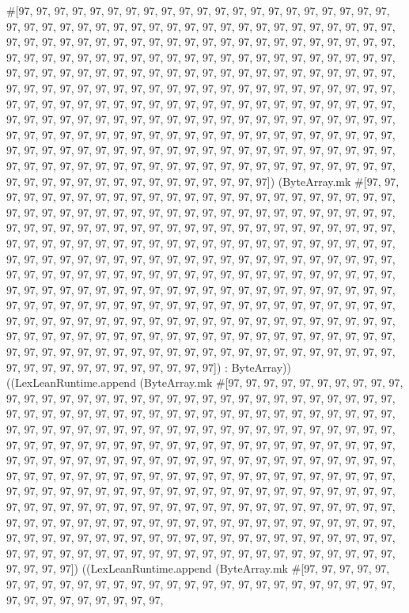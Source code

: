\documentclass[11pt]{article}
\begin{document}
\#[97, 97, 97, 97, 97, 97, 97, 97, 97, 97, 97, 97, 97, 97, 97, 97, 97, 97, 97, 97, 97, 97, 97, 97, 97, 97, 97, 97, 97, 97, 97, 97, 97, 97, 97, 97, 97, 97, 97, 97, 97, 97, 97, 97, 97, 97, 97, 97, 97, 97, 97, 97, 97, 97, 97, 97, 97, 97, 97, 97, 97, 97, 97, 97, 97, 97, 97, 97, 97, 97, 97, 97, 97, 97, 97, 97, 97, 97, 97, 97, 97, 97, 97, 97, 97, 97, 97, 97, 97, 97, 97, 97, 97, 97, 97, 97, 97, 97, 97, 97, 97, 97, 97, 97, 97, 97, 97, 97, 97, 97, 97, 97, 97, 97, 97, 97, 97, 97, 97, 97, 97, 97, 97, 97, 97, 97, 97, 97, 97, 97, 97, 97, 97, 97, 97, 97, 97, 97, 97, 97, 97, 97, 97, 97, 97, 97, 97, 97, 97, 97, 97, 97, 97, 97, 97, 97, 97, 97, 97, 97, 97, 97, 97, 97, 97, 97, 97, 97, 97, 97, 97, 97, 97, 97, 97, 97, 97, 97, 97, 97, 97, 97, 97, 97, 97, 97, 97, 97, 97, 97, 97, 97, 97, 97, 97, 97, 97, 97, 97, 97, 97, 97, 97, 97, 97, 97, 97, 97, 97, 97, 97, 97, 97, 97, 97, 97, 97, 97, 97, 97, 97, 97, 97, 97, 97, 97, 97, 97, 97, 97, 97, 97, 97, 97, 97, 97, 97, 97, 97, 97, 97, 97, 97, 97, 97, 97, 97, 97, 97, 97, 97, 97, 97, 97, 97, 97]) (ByteArray.mk \#[97, 97, 97, 97, 97, 97, 97, 97, 97, 97, 97, 97, 97, 97, 97, 97, 97, 97, 97, 97, 97, 97, 97, 97, 97, 97, 97, 97, 97, 97, 97, 97, 97, 97, 97, 97, 97, 97, 97, 97, 97, 97, 97, 97, 97, 97, 97, 97, 97, 97, 97, 97, 97, 97, 97, 97, 97, 97, 97, 97, 97, 97, 97, 97, 97, 97, 97, 97, 97, 97, 97, 97, 97, 97, 97, 97, 97, 97, 97, 97, 97, 97, 97, 97, 97, 97, 97, 97, 97, 97, 97, 97, 97, 97, 97, 97, 97, 97, 97, 97, 97, 97, 97, 97, 97, 97, 97, 97, 97, 97, 97, 97, 97, 97, 97, 97, 97, 97, 97, 97, 97, 97, 97, 97, 97, 97, 97, 97, 97, 97, 97, 97, 97, 97, 97, 97, 97, 97, 97, 97, 97, 97, 97, 97, 97, 97, 97, 97, 97, 97, 97, 97, 97, 97, 97, 97, 97, 97, 97, 97, 97, 97, 97, 97, 97, 97, 97, 97, 97, 97, 97, 97, 97, 97, 97, 97, 97, 97, 97, 97, 97, 97, 97, 97, 97, 97, 97, 97, 97, 97, 97, 97, 97, 97, 97, 97, 97, 97, 97, 97, 97, 97, 97, 97, 97, 97, 97, 97, 97, 97, 97, 97, 97, 97, 97, 97, 97, 97, 97, 97, 97, 97, 97, 97, 97, 97, 97, 97, 97, 97, 97, 97, 97, 97, 97, 97, 97, 97, 97, 97, 97, 97, 97, 97, 97, 97, 97, 97, 97, 97, 97, 97, 97, 97, 97, 97]) : ByteArray)) ((LexLeanRuntime.append (ByteArray.mk \#[97, 97, 97, 97, 97, 97, 97, 97, 97, 97, 97, 97, 97, 97, 97, 97, 97, 97, 97, 97, 97, 97, 97, 97, 97, 97, 97, 97, 97, 97, 97, 97, 97, 97, 97, 97, 97, 97, 97, 97, 97, 97, 97, 97, 97, 97, 97, 97, 97, 97, 97, 97, 97, 97, 97, 97, 97, 97, 97, 97, 97, 97, 97, 97, 97, 97, 97, 97, 97, 97, 97, 97, 97, 97, 97, 97, 97, 97, 97, 97, 97, 97, 97, 97, 97, 97, 97, 97, 97, 97, 97, 97, 97, 97, 97, 97, 97, 97, 97, 97, 97, 97, 97, 97, 97, 97, 97, 97, 97, 97, 97, 97, 97, 97, 97, 97, 97, 97, 97, 97, 97, 97, 97, 97, 97, 97, 97, 97, 97, 97, 97, 97, 97, 97, 97, 97, 97, 97, 97, 97, 97, 97, 97, 97, 97, 97, 97, 97, 97, 97, 97, 97, 97, 97, 97, 97, 97, 97, 97, 97, 97, 97, 97, 97, 97, 97, 97, 97, 97, 97, 97, 97, 97, 97, 97, 97, 97, 97, 97, 97, 97, 97, 97, 97, 97, 97, 97, 97, 97, 97, 97, 97, 97, 97, 97, 97, 97, 97, 97, 97, 97, 97, 97, 97, 97, 97, 97, 97, 97, 97, 97, 97, 97, 97, 97, 97, 97, 97, 97, 97, 97, 97, 97, 97, 97, 97, 97, 97, 97, 97, 97, 97, 97, 97, 97, 97, 97, 97, 97, 97, 97, 97, 97, 97, 97, 97, 97, 97, 97, 97, 97, 97, 97, 97, 97, 97]) ((LexLeanRuntime.append (ByteArray.mk \#[97, 97, 97, 97, 97, 97, 97, 97, 97, 97, 97, 97, 97, 97, 97, 97, 97, 97, 97, 97, 97, 97, 97, 97, 97, 97, 97, 97, 97, 97, 97, 97, 97, 97, 97, 97, 
\end{document}
